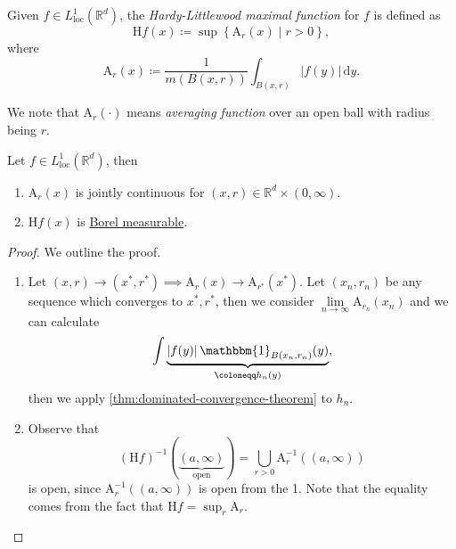 \begin{definition}\label{def:HL-maximal-function}
	Given \(f\in L^1_{\text{loc} }(\mathbb{R} ^d)\), the \emph{Hardy-Littlewood maximal function} for \(f\) is defined as
	\[
		\mathrm{H}f(x) \coloneqq \sup \left\{\mathrm{A}_r(x)\mid r > 0\right\},
	\]
	where
	\[
		\mathrm{A}_r(x) \coloneqq \frac{1}{m(B(x, r))}\int _{B(x, r)} \left\vert f(y) \right\vert \,\mathrm{d}y.
	\]
\end{definition}
\begin{note}
	We note that \(\mathrm{A}_r(\cdot) \) means \emph{averaging function} over an open ball with radius being \(r\).
\end{note}
\begin{lemma}\label{lma:lec21}
	Let \(f\in L^1_{\text{loc} }(\mathbb{R} ^d)\), then
	\begin{enumerate}[(1)]
		\item \(\mathrm{A}_r(x)\) is jointly continuous for \((x, r)\in \mathbb{R} ^d \times (0, \infty )\).
		\item \(\mathrm{H}f(x) \) is \hyperref[def:Borel-measurable-function]{Borel measurable}.
	\end{enumerate}
\end{lemma}
\begin{proof}
	We outline the proof.
	\begin{enumerate}[(1)]
		\item Let \((x, r)\to (x^\ast, r^\ast)\implies \mathrm{A}_r(x)\to \mathrm{A}_{r^\ast}(x^\ast)\). Let \((x_{n} , r_{n} )\) be any sequence which converges to
		      \(x^\ast, r^\ast\), then we consider \(\lim\limits_{n \to \infty} \mathrm{A}_{r_{n} }(x_{n} )\) and we can calculate
		      \[
			      \int\underbrace{\left\vert f(y) \right\vert \mathbbm{1}_{B(x_{n} , r_{n} )} (y)}_{\coloneqq h_{n} (y)},
		      \]
		      then we apply \autoref{thm:dominated-convergence-theorem} to \(h_{n} \).
		\item Observe that
		      \[
			      (\mathrm{H}f)^{-1} (\underbrace{(a, \infty )}_{\text{open} }) = \bigcup\limits_{r>0} \mathrm{A}_{r} ^{-1} \left((a, \infty )\right)
		      \]
		      is open, since \(\mathrm{A} _{r} ^{-1} \left((a, \infty )\right)\) is open from the 1. Note that the equality comes from the fact that \(\mathrm{H}f = \sup_{r} \mathrm{A} _{r} \).
	\end{enumerate}
\end{proof}


